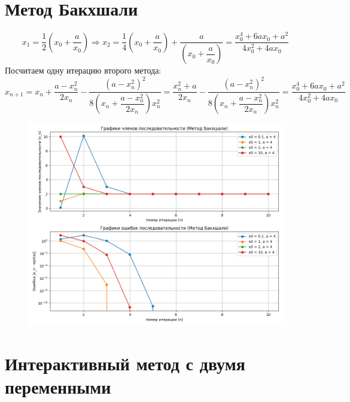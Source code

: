 \documentclass{report}
\begin{document}
\section{\textbf{Метод Бакхшали}}
\begin{equation*}
	x_1=\frac{1}{2}\left(x_0+\dfrac{a}{x_0}\right) \Rightarrow x_2 =\frac{1}{4}\left(x_0+\dfrac{a}{x_0}\right)+\dfrac{a}{\left(x_0+\dfrac{a}{x_0}\right)}=\dfrac{x_0^4+6ax_0+a^2}{4x_0^2+4ax_0}
\end{equation*}
Посчитаем одну итерацию второго метода:
\begin{equation*}
	x_{n+1}=x_n+\dfrac{a-x_n^2}{2x_n}-\dfrac{(a-x_n^2)^2}{8\left(x_n+\dfrac{a-x_n^2}{2x_n}\right)x_n^2}=
	\dfrac{x_n^2+a}{2x_n}-\dfrac{(a-x_n^2)^2}{8\left(x_n+\dfrac{a-x_n^2}{2x_n}\right)x_n^2}=
	\dfrac{x_0^4+6ax_0+a^2}{4x_0^2+4ax_0}
\end{equation*}
\begin{figure}[H]
	\begin{center}
		\includegraphics[scale=0.5]{2.png}
	\end{center}
\end{figure}



\section{\textbf{Интерактивный метод с двумя переменными}}
\end{document}
